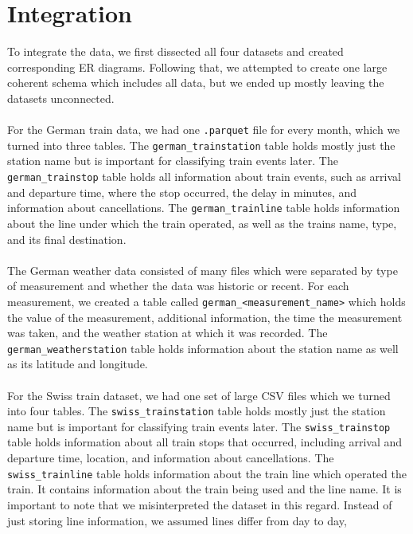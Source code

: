 \setlength{\parindent}{0pt}

\section{Integration}

To integrate the data, we first dissected all four datasets and created corresponding ER diagrams.
Following that, we attempted to create one large coherent schema which includes all data,
but we ended up mostly leaving the datasets unconnected.\\\\
For the German train data, we had one \texttt{.parquet} file \cite{apache_parquet} for every month,
which we turned into three tables.
The \texttt{german\_trainstation} table holds mostly just the station name
but is important for classifying train events later.
The \texttt{german\_trainstop} table holds all information about train events,
such as arrival and departure time, where the stop occurred,
the delay in minutes, and information about cancellations.
The \texttt{german\_trainline} table holds information about the line
under which the train operated, as well as the trains name, type, and its final destination.\\\\
The German weather data consisted of many files which were separated by
type of measurement and whether the data was historic or recent.
For each measurement, we created a table called
\texttt{german\_<measurement\_name>} which holds the value of the measurement,
additional information, the time the measurement was taken,
and the weather station at which it was recorded.
The \texttt{german\_weatherstation} table holds information about the station name
as well as its latitude and longitude.\\\\
For the Swiss train dataset, we had one set of large CSV files
which we turned into four tables.
The \texttt{swiss\_trainstation} table holds mostly just the station name
but is important for classifying train events later.
The \texttt{swiss\_trainstop} table holds information about all train stops that occurred,
including arrival and departure time, location,
and information about cancellations.
The \texttt{swiss\_trainline} table holds information about the train line
which operated the train.
It contains information about the train being used and the line name.
It is important to note that we misinterpreted the dataset in this regard.
Instead of just storing line information,
we assumed lines differ from day to day,
